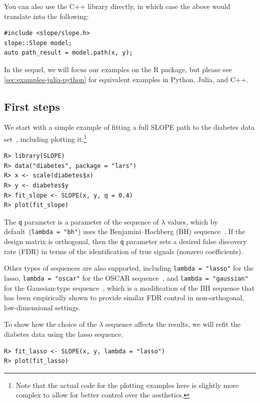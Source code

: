 \documentclass[a4paper,fleqn]{cas-sc}
\begin{document}
\medskip

You can also use the C++ library directly, in which case the above would
translate into the following:
\begin{Verbatim}
#include <slope/slope.h>
slope::Slope model;
auto path_result = model.path(x, y);
\end{Verbatim}

In the sequel, we will focus our examples on the \textsf{R} package, but please
see \autoref{sec:examples-julia-python} for equivalent examples in
\textsf{Python}, \textsf{Julia}, and \textsf{C++}.

\subsection{First steps}
\label{sec:first-steps}

We start with a simple example of fitting a full SLOPE path to the diabetes data
set~\citep{efron2004}, including plotting it.\footnote{Note that the actual code
for the plotting examples here is slightly more complex to allow for better
control over the aesthetics.}

\begin{Verbatim}
R> library(SLOPE)
R> data("diabetes", package = "lars")
R> x <- scale(diabetes$x)
R> y <- diabetes$y
R> fit_slope <- SLOPE(x, y, q = 0.4)
R> plot(fit_slope)
\end{Verbatim}

The \texttt{q} parameter is a parameter of the sequence of \(\lambda\) values,
which by default~(\texttt{lambda = "bh"}) uses the Benjamini--Hochberg (BH)
sequence~\citep{bogdan2015}. If the design matrix is orthogonal, then the
\texttt{q} parameter sets a desired false discovery rate (FDR) in terms of the
identification of true signals (nonzero coefficients).

Other types of sequences are also supported, including \texttt{lambda = "lasso"}
for the lasso, \texttt{lambda = "oscar"} for the OSCAR
sequence~\citep{bondell2008}, and \texttt{lambda = "gaussian"} for the
Gaussian-type sequence~\citep{bogdan2015}, which is a modification of the BH
sequence that has been empirically shown to provide similar FDR control in
non-orthogonal, low-dimensional settings.

To show how the choice of the \(\lambda\) sequence affects the results, we will
refit the diabetes data using the lasso sequence.

\begin{Verbatim}
R> fit_lasso <- SLOPE(x, y, lambda = "lasso")
R> plot(fit_lasso)
\end{Verbatim}
\end{document}
